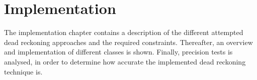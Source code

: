 \chapter{Implementation}
\label{chapter:implementation}

The implementation chapter contains a description of the different attempted dead reckoning approaches and the required constraints.
Thereafter, an overview and implementation of different classes is shown.
Finally, precision tests is analysed, in order to determine how accurate the implemented dead reckoning technique is.

	








